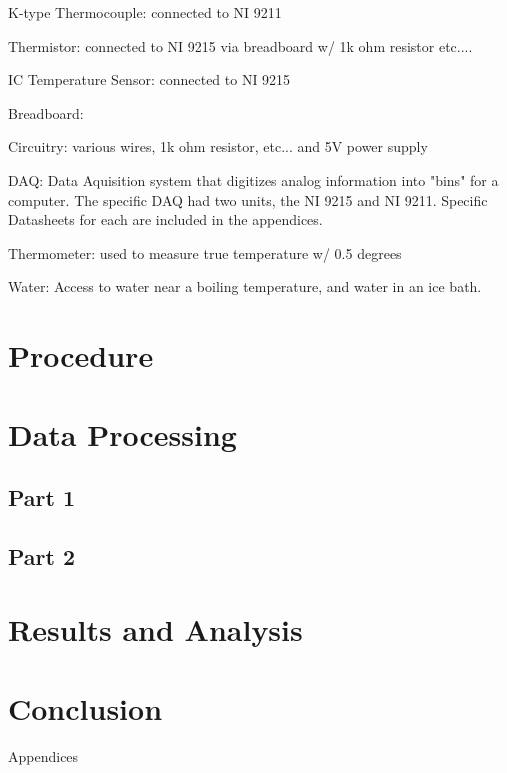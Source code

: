 \documentclass{article}
\begin{document}
K-type Thermocouple:  connected to NI 9211

Thermistor:  connected to NI 9215 via breadboard w/ 1k ohm resistor etc....

IC Temperature Sensor: connected to NI 9215

Breadboard: 

Circuitry:  various wires, 1k ohm resistor, etc... and 5V power supply

DAQ:  Data Aquisition system that digitizes analog information into "bins" for a computer.  The specific DAQ had two units, the NI 9215 and NI 9211.  Specific Datasheets for each are included in the appendices.  

Thermometer:  used to measure true temperature w/ 0.5 degrees 

Water:  Access to water near a boiling temperature, and water in an ice bath.   




\section{Procedure}


\section{Data Processing}

\subsection{Part 1}


\subsection{Part 2}


\section{Results and Analysis}



\section{Conclusion}




\newpage
\thispagestyle{empty}  %
\begin{center}
	\vspace*{\fill}
	{\Huge Appendices}
	\vspace*{\fill}
\end{center}
\end{document}
